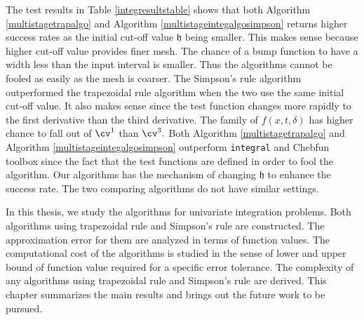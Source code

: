 \documentclass{iitthesis}
\theoremstyle{definition}
\theoremstyle{remark}
\begin{document}
The test results in Table \ref{integresultstable} shows that both Algorithm \ref{multistagetrapalgo} and Algorithm \ref{multistageintegalgosimpson} returns higher success rates as the initial cut-off value $\mathfrak{h}$ being smaller. This makes sense because higher cut-off value provides finer mesh. The chance of a bump function to have a width less than the input interval is smaller. Thus the algorithms cannot be fooled as easily as the mesh is coarser. The Simpson's rule algorithm outperformed the trapezoidal rule algorithm when the two use the same initial cut-off value. It also makes sense since the test function changes more rapidly to the first derivative than the third derivative. The family of $f(x,t,\delta)$ has higher chance to fall out of $\cv^1$ than $\cv^3.$ Both Algorithm \ref{multistagetrapalgo} and Algorithm \ref{multistageintegalgosimpson} outperform {\tt integral} and Chebfun toolbox since the fact that the test functions are defined in order to fool the algorithm. Our algorithms has the mechanism of changing $\mathfrak{h}$ to enhance the success rate. The two comparing algorithms do not have similar settings.




In this thesis, we study the algorithms for univariate integration problems. Both algorithms using trapezoidal rule and Simpson's rule are constructed. The approximation error for them are analyzed in terms of function values. The computational cost of the algorithms is studied in the sense of lower and upper bound of function value required for a specific error tolerance. The complexity of any algorithms using trapezoidal rule and Simpson's rule are derived. This chapter summarizes the main results and brings out the future work to be pursued.


\end{document}
